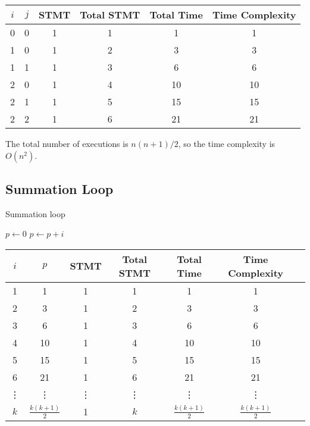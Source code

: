 \documentclass{article}
\begin{document}
\begin{table}[H]
    \centering
    \begin{tabular}{|c|c|c|c|c|c|}
        \hline
        $i$ & $j$ & STMT & Total STMT & Total Time & Time Complexity \\
        \hline
        0 & 0 & 1 & 1 & 1 & 1 \\
        1 & 0 & 1 & 2 & 3 & 3 \\
        1 & 1 & 1 & 3 & 6 & 6 \\
        2 & 0 & 1 & 4 & 10 & 10 \\
        2 & 1 & 1 & 5 & 15 & 15 \\
        2 & 2 & 1 & 6 & 21 & 21 \\
        \hline
    \end{tabular}
\end{table}

The total number of executions is $n(n+1)/2$, so the time complexity is $O(n^2)$.

\subsection{Summation Loop}
\begin{algorithm}[H]
    \caption{Summation loop}\label{simple_for5}
    \begin{algorithmic}
        \State $p \gets 0$
            \State $p \gets p + i$
        \EndFor
    \end{algorithmic}
\end{algorithm}

\begin{table}[H]
    \centering
    \begin{tabular}{|c|c|c|c|c|c|c|}
        \hline
        $i$ & $p$ & STMT & Total STMT & Total Time & Time Complexity \\
        \hline
        1 & 1 & 1 & 1 & 1 & 1 \\
        2 & 3 & 1 & 2 & 3 & 3 \\
        3 & 6 & 1 & 3 & 6 & 6 \\
        4 & 10 & 1 & 4 & 10 & 10 \\
        5 & 15 & 1 & 5 & 15 & 15 \\
        6 & 21 & 1 & 6 & 21 & 21 \\
        \vdots & \vdots & \vdots & \vdots & \vdots & \vdots \\
        $k$ & $\frac{k(k+1)}{2}$ & 1 & $k$ & $\frac{k(k+1)}{2}$ & $\frac{k(k+1)}{2}$ \\
        \hline
    \end{tabular}
\end{table}
\end{document}

